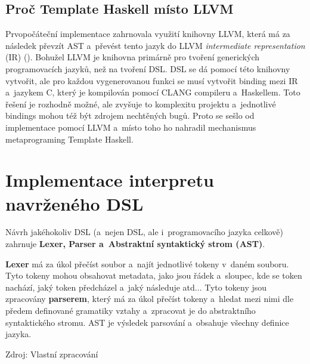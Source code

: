 \documentclass[male, czech]{kithesis}
\begin{document}
\section{Proč Template Haskell místo LLVM}

Prvopočáteční implementace zahrnovala využití knihovny LLVM,
která má za následek převzít AST
a~převést tento jazyk do LLVM \textit{intermediate representation} (IR) (\cite{IntroToLLVM}).
Bohužel LLVM je knihovna primárně pro tvoření generických programovacích jazyků, 
než na tvoření DSL. 
DSL se dá pomocí této knihovny vytvořit, 
ale pro každou vygenerovanou funkci se musí vytvořit binding mezi IR
a~jazykem C, 
který je kompilován pomocí CLANG compileru a~Haskellem. 
Toto řešení je rozhodně možné, 
ale zvyšuje to komplexitu projektu
a~jednotlivé bindings mohou též být zdrojem nechtěných bugů. 
Proto se sešlo od implementace pomocí LLVM
a~místo toho ho nahradil mechanismus metaprograming Template Haskell.


\chapter{Implementace interpretu navrženého DSL}

Návrh jakéhokoliv DSL (a~nejen DSL, ale i~programovacího jazyka celkově) zahrnuje
\textbf{Lexer, Parser a~Abstraktní syntaktický strom (AST)}.

\textbf{Lexer} má za úkol přečíst soubor
a~najít jednotlivé tokeny v~daném souboru.
Tyto tokeny mohou obsahovat metadata, 
jako jsou řádek a~sloupec, 
kde se token nachází,
jaký token předcházel a~jaký následuje atd... 
Tyto tokeny jsou zpracovány \textbf{parserem}, 
který má za úkol přečíst tokeny
a~hledat mezi nimi dle předem definované gramatiky vztahy
a~zpracovat je do abstraktního syntaktického stromu. 
AST je výsledek parsování
a~obsahuje všechny definice jazyka.

{\begin{center}
Zdroj: Vlastní zpracování
\end{center}
}
\end{document}
